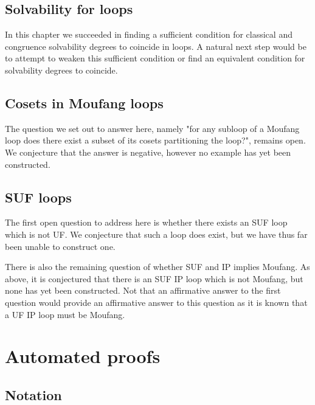 \documentclass[12pt]{report}
\theoremstyle{definition}
\begin{document}
\section{Solvability for loops}

In this chapter we succeeded in finding a sufficient condition for classical and congruence solvability
  degrees to coincide in loops. A natural next step would be to attempt to weaken this sufficient
  condition or find an equivalent condition for solvability degrees to coincide.

\section{Cosets in Moufang loops}

The question we set out to answer here, namely "for any subloop of a Moufang loop does there exist a
  subset of its cosets partitioning the loop?", remains open. We conjecture that the answer is negative,
  however no example has yet been constructed.

\section{SUF loops}

The first open question to address here is whether there exists an SUF loop which is not UF. We conjecture
  that such a loop does exist, but we have thus far been unable to construct one.

There is also the remaining question of whether SUF and IP implies Moufang. As above, it is conjectured that
  there is an SUF IP loop which is not Moufang, but none has yet been constructed. Not that an affirmative
  answer to the first question would provide an affirmative answer to this question as it is known
  \cite{SUF} that a UF IP loop must be Moufang.






\appendix

\chapter{Automated proofs}

\section{Notation}
\end{document}
